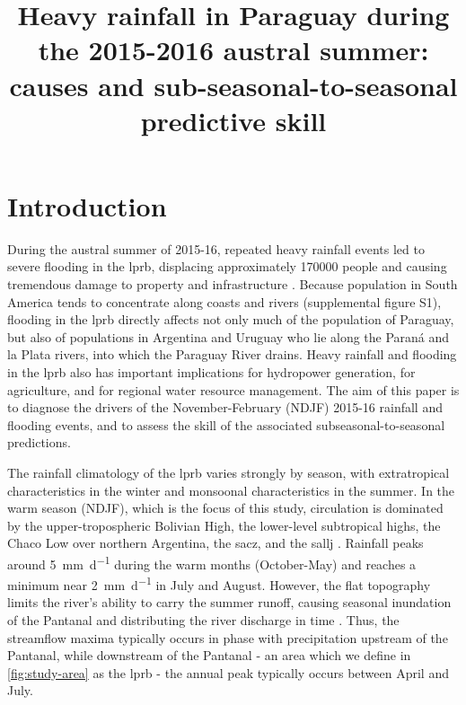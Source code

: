 \documentclass{ametsoc}
\title{Heavy rainfall in Paraguay during the 2015-2016 austral summer: causes and sub-seasonal-to-seasonal predictive skill}
\affiliation{Columbia Water Center. Dept. of Earth and Environmental Engineering, Columbia University, 500 W. 120th St., New York, NY. USA \\ Columbia Water Center, Columbia University, 500 W. 120th St., New York, NY. USA}
\begin{document}
\maketitle

\section{Introduction}

During the austral summer of 2015-16, repeated heavy rainfall events led to severe flooding in the \gls{lprb}, displacing approximately \num{170000} people \citep{Brakenridge2016} and causing tremendous damage to property and infrastructure \citep{MinisteriodeObrasPublicasyComunicacion2016}.
Because population in South America tends to concentrate along coasts and rivers (supplemental figure S1), flooding in the \gls{lprb} directly affects not only much of the population of Paraguay, but also of populations in Argentina and Uruguay who lie along the Paran\'{a} and la Plata rivers, into which the Paraguay River drains.
Heavy rainfall and flooding in the \gls{lprb} also has important implications for hydropower generation, for agriculture, and for regional water resource management.
The aim of this paper is to diagnose the drivers of the November-February (NDJF) 2015-16 rainfall and flooding events, and to assess the skill of the associated subseasonal-to-seasonal predictions.

The rainfall climatology of the \gls{lprb} varies strongly by season, with extratropical characteristics in the winter and monsoonal characteristics in the summer.
In the warm season (NDJF), which is the focus of this study, circulation is dominated by the upper-tropospheric Bolivian High, the lower-level subtropical highs, the Chaco Low over northern Argentina, the \gls{sacz}, and the \gls{sallj} \citep{Grimm2009,Marengo2012}.
Rainfall peaks around \SI{5}{\milli\meter\per\day} during the warm months (October-May) and reaches a minimum near \SI{2}{\milli\meter\per\day} in July and August.
However, the flat topography limits the river's ability to carry the summer runoff, causing seasonal inundation of the Pantanal and distributing the river discharge in time \citep{Bravo2011,Barros2004}.
Thus, the streamflow maxima typically occurs in phase with precipitation upstream of the Pantanal, while downstream of the Pantanal - an area which we define in \cref{fig:study-area} as the \acrlong{lprb} - the annual peak typically occurs between April and July.
\end{document}
